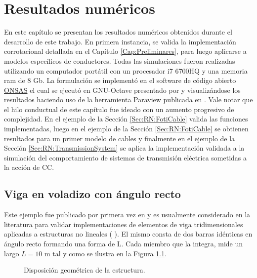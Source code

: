 \chapter{Resultados numéricos}\label{Cap:ResultadosNumericos}
\linenumbers
En este capítulo se presentan los resultados numéricos obtenidos durante el desarrollo de este trabajo. En primera instancia, se valida la implementación corrotacional detallada en el Capítulo \ref{Cap:Preliminares}, para luego aplicarse a modelos específicos de conductores. Todas las simulaciones fueron realizadas utilizando un computador portátil con un procesador i7 6700HQ y una memoria ram de 8 Gb. La formulación se implementó en el software de código abierto \href{https://github.com/ONSAS/ONSAS.m/}{ONSAS} el cual se ejecutó en GNU-Octave presentado por \cite{eaton2007gnu} y visualizándose los resultados haciendo uso de la herramienta Paraview publicada en \citep{ahrens2014image}. Vale notar que el hilo conductual de este capítulo fue ideado con un aumento progresivo de complejidad. En el ejemplo de la Sección \ref{Sec:RN:FotiCable} valida las funciones implementadas, luego en el ejemplo de la Sección \ref{Sec:RN:FotiCable} se obtienen resultados para un primer modelo de cables y finalmente en el ejemplo de la Sección \ref{Sec:RN:TransmissionSystem} se aplica la implementación validada a la simulación del comportamiento de sistemas de transmisión eléctrica sometidas a la acción de CC.


\section{Viga en voladizo con ángulo recto}\label{Sec:RN:RightAngle}
Este ejemplo fue publicado por primera vez en \citep{simo1988dynamics} y es usualmente considerado en la literatura para validar implementaciones de elementos de viga tridimensionales aplicadas a estructuras no lineales (\citep{albino2018co} \citep{Le2014}). El mismo consta de dos barras idénticas en ángulo recto formando una forma de L. Cada miembro que la integra, mide un largo $L=10$ m tal y como se ilustra en la Figura \ref{fig:RN:RA:esquemas}.

\begingroup
\centering
\begin{figure}[htbp]
	\centering
	\label{fig:RN:RA:Ilusxy}
	\label{fig:RN:RA:Ilusyz}
	\caption{Disposición geométrica de la estructura.} 	\label{fig:RN:RA:esquemas}
\end{figure}
\endgroup

